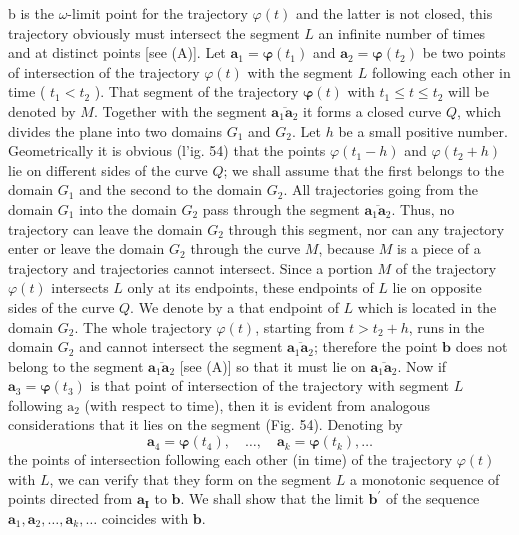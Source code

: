 \documentclass[10pt,a5paper]{book}
\makeatletter
\theoremstyle{plain}
\theoremstyle{definition}
\theoremstyle{remark}
\renewenvironment{proof}[1][\proofname]{\par
  \pushQED{\qed}%
  \normalfont\topsep6\p@\@plus6\p@\relax
  \trivlist
  \item\relax{\itshape #1\@addpunct{.}}\hspace\labelsep\ignorespaces
}{\popQED\endtrivlist\@endpefalse}
\makeatother
\begin{document}
\begin{proof}
b is the $\omega$-limit point for the trajectory $\varphi(t)$ and the latter is not closed, this trajectory obviously must intersect the segment $L$ an infinite number of times and at distinct points [see (A)]. Let $\mathbf{a}_{1}=\boldsymbol{\varphi}\left(t_{1}\right)$ and $\mathbf{a}_{2}=\boldsymbol{\varphi}\left(t_{2}\right)$ be two points of intersection of the trajectory $\varphi(t)$ with the segment $L$ following each other in time ( $t_{1}<t_{2}$ ). That segment of the trajectory $\boldsymbol{\varphi}(t)$ with $t_{1} \leq t \leq t_{2}$ will be denoted by $M$. Together with the segment $\overline{\mathbf{a}_{1} \mathbf{a}_{2}}$ it forms a closed curve $Q$, which divides the plane into two domains $G_{1}$ and $G_{2}$. Let $h$ be a small positive number. Geometrically it is obvious (l'ig. 54) that the points $\varphi\left(t_{1}-h\right)$ and $\varphi\left(t_{2}+h\right)$ lie on different sides of the curve $Q$; we shall assume that the first belongs to the domain $G_{1}$ and the second to the domain $G_{2}$. All trajectories going from the domain $G_{1}$ into the domain $G_{2}$ pass through the segment $\overline{\mathbf{a}_{1} \mathbf{a}_{2}}$. Thus, no trajectory can leave the domain $G_{2}$ through this segment, nor can any trajectory enter or leave the domain $G_{2}$ through the curve $M$, because $M$ is a piece of a trajectory and trajectories cannot intersect. Since a portion $M$ of the trajectory $\varphi(t)$ intersects $L$ only at its endpoints, these endpoints of $L$ lie on opposite sides of the curve $Q$. We denote by a that endpoint of $L$ which is located in the domain $G_{2}$. The whole trajectory $\varphi(t)$, starting from $t>t_{2}+h$, runs in the domain $G_{2}$ and cannot intersect the segment $\overline{\mathbf{a}_{1} \mathbf{a}_{2}}$; therefore the point $\mathbf{b}$ does not belong to the segment $\overline{\mathbf{a}_{1} \mathbf{a}_{2}}$ [see (A)] so that it must lie on $\overline{\mathbf{a}_{1} \mathbf{a}_{2}}$. Now if $\mathbf{a}_{3}=\boldsymbol{\varphi}\left(t_{3}\right)$ is that point of intersection of the trajectory with segment $L$ following $\mathrm{a}_{2}$ (with respect to time), then it is evident from analogous considerations that it lies on the segment (Fig. 54). Denoting by
\[
\mathbf{a}_{4}=\boldsymbol{\varphi}\left(t_{4}\right), \quad \ldots, \quad \mathbf{a}_{k}=\boldsymbol{\varphi}\left(t_{k}\right), \ldots
\]
the points of intersection following each other (in time) of the trajectory $\varphi(t)$ with $L$, we can verify that they form on the segment $L$ a monotonic
sequence of points directed from $\mathbf{a}_{\mathbf{I}}$ to $\mathbf{b}$. We shall show that the limit $\mathbf{b}^{\prime}$ of the sequence $\mathbf{a}_{1}, \mathbf{a}_{2}, \ldots, \mathbf{a}_{k}, \ldots$ coincides with $\mathbf{b}$.


\end{proof}
\end{document}
